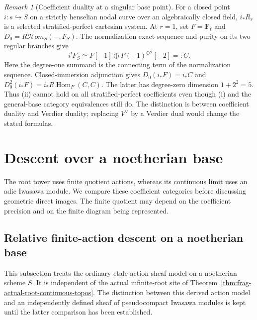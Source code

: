 \documentclass[11pt]{article}
\theoremstyle{definition}
\theoremstyle{remark}
\newtheorem{remark}[theorem]{Remark}
\begin{document}
\begin{remark}[Coefficient duality at a singular base point]
For a closed point $i:s\hookrightarrow S$ on a strictly henselian
nodal curve over an algebraically closed field, $i_*R_r$ is a selected
stratified-perfect cartesian system.  At $r=1$, set $F=\mathbf F_\ell$
and $D_0=R\mathcal Hom_S(-,F_S)$.  The normalization exact sequence
and purity on its two regular branches
\cite[Proposition 4.10.1]{LaszloOlssonFinite} give
\[
 i^!F_S\simeq F[-1]\oplus F(-1)^{\oplus2}[-2]=:C.
\]
Here the degree-one summand is the connecting term of the
normalization sequence.  Closed-immersion adjunction gives
$D_0(i_*F)=i_*C$ and $D_0^2(i_*F)=i_*R\operatorname{Hom}_F(C,C)$.
The latter has degree-zero dimension $1+2^2=5$.
Thus (ii) cannot hold on all stratified-perfect coefficients even
though (i) and the general-base category equivalences still do.
The distinction is between coefficient duality and Verdier duality;
replacing $V^\vee$ by a Verdier dual would change the stated formulas.
\end{remark}


\section{Descent over a noetherian base}
\label{sec:frag-coefficient-descent}

The root tower uses finite quotient actions, whereas its continuous
limit uses an adic Iwasawa module.  We compare these coefficient
categories before discussing geometric direct images.  The finite
quotient may depend on the coefficient precision and on the finite
diagram being represented.

\subsection{Relative finite-action descent on a noetherian base}
\label{sec:frag-relative-action-descent}
This subsection treats the ordinary etale action-sheaf model on a
noetherian scheme $S$.  It is independent of the actual infinite-root
site of Theorem~\ref{thm:frag-actual-root-continuous-topos}.  The distinction between this derived action model and
an independently defined sheaf of pseudocompact Iwasawa modules is kept
until the latter comparison has been established.
\end{document}
